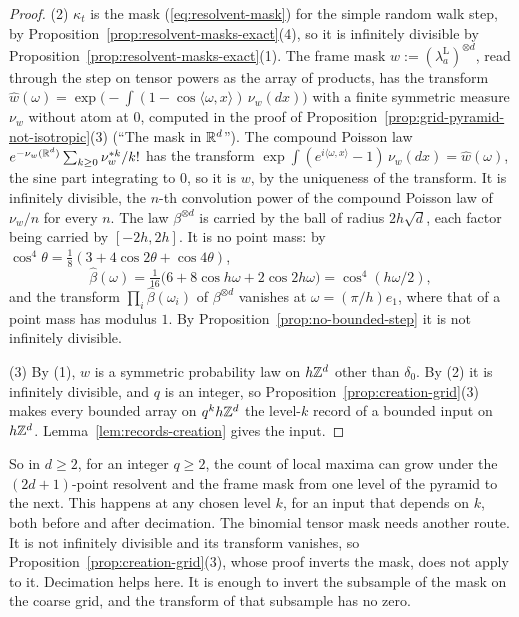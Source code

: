 \begin{proof}
(2) $\kappa_t$ is the mask (\ref{eq:resolvent-mask}) for the simple random walk step, by
Proposition~\ref{prop:resolvent-masks-exact}(4), so it is infinitely divisible by
Proposition~\ref{prop:resolvent-masks-exact}(1). The frame mask $w := (\lambda^{\mathrm L}_a)^{\otimes d}$, read through the step on tensor powers as
the array of products, has the transform
$\widehat{w}(\omega) = \exp\bigl(-\int(1 - \cos\langle\omega, x\rangle)\,\nu_w(dx)\bigr)$ with a
finite symmetric measure $\nu_w$ without atom at $0$, computed in the proof of
Proposition~\ref{prop:grid-pyramid-not-isotropic}(3) (``The mask in $\mathbb{R}^d$''). The compound
Poisson law $e^{-\nu_w(\mathbb{R}^d)}\sum_{k \ge 0}\nu_w^{*k}/k!$ has the transform
$\exp\int(e^{i\langle\omega, x\rangle} - 1)\,\nu_w(dx) = \widehat{w}(\omega)$, the sine part
integrating to $0$, so it is $w$, by the uniqueness of the transform. It is infinitely divisible,
the $n$-th convolution power of the compound Poisson law of $\nu_w/n$ for every $n$. The law
$\beta^{\otimes d}$ is carried by the ball of radius $2h\sqrt d$, each factor being carried by
$[-2h, 2h]$. It is no point mass: by
$\cos^4\theta = \tfrac18(3 + 4\cos 2\theta + \cos 4\theta)$,
\[
\widehat{\beta}(\omega) = \tfrac{1}{16}\bigl(6 + 8\cos h\omega + 2\cos 2h\omega\bigr) =
\cos^4(h\omega/2),
\]
and the transform $\prod_i\widehat{\beta}(\omega_i)$ of $\beta^{\otimes d}$ vanishes at
$\omega = (\pi/h)e_1$, where that of a point mass has modulus $1$. By
Proposition~\ref{prop:no-bounded-step} it is not infinitely divisible.

(3) By (1), $w$ is a symmetric probability law on $h\mathbb{Z}^d$ other than $\delta_0$. By (2) it is
infinitely divisible, and $q$ is an integer, so Proposition~\ref{prop:creation-grid}(3) makes every
bounded array on $q^kh\mathbb{Z}^d$ the level-$k$ record of a bounded input on $h\mathbb{Z}^d$.
Lemma~\ref{lem:records-creation} gives the input.
\end{proof}

So in $d \ge 2$, for an integer $q \ge 2$, the count of local maxima can grow under the
$(2d+1)$-point resolvent and the frame mask from one level of the pyramid to the next. This happens
at any chosen level $k$, for an input that depends on $k$, both before and after decimation. The
binomial tensor mask needs another route. It is not infinitely divisible and its transform vanishes, so
Proposition~\ref{prop:creation-grid}(3), whose proof inverts the mask, does not apply to it.
Decimation helps here. It is enough to invert the subsample of the mask on the coarse grid, and the
transform of that subsample has no zero.

